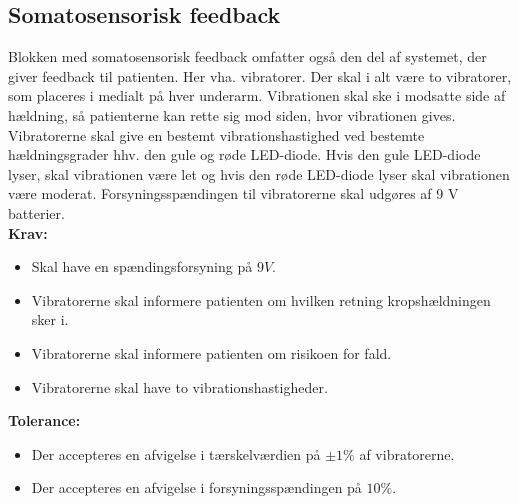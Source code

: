 \subsection{Somatosensorisk feedback} 
Blokken med somatosensorisk feedback omfatter også den del af systemet, der giver feedback til patienten. Her vha. vibratorer. Der skal i alt være to vibratorer, som placeres i medialt på hver underarm. Vibrationen skal ske i modsatte side af hældning, så patienterne kan rette sig mod siden, hvor vibrationen gives. Vibratorerne skal give en bestemt vibrationshastighed ved bestemte hældningsgrader hhv. den gule og røde LED-diode. Hvis den gule LED-diode lyser, skal vibrationen være let og hvis den røde LED-diode lyser skal vibrationen være moderat. Forsyningsspændingen til vibratorerne skal udgøres af 9 V batterier.
\\
\textbf{Krav:}
\begin{itemize}
	\item Skal have en spændingsforsyning på $9V$.
	\item Vibratorerne skal informere patienten om hvilken retning kropshældningen sker i.
	\item Vibratorerne skal informere patienten om risikoen for fald.
	\item Vibratorerne skal have to vibrationshastigheder.
\end{itemize}
\textbf{Tolerance:}
\begin{itemize}
	\item Der accepteres en afvigelse i tærskelværdien på $\pm1\%$ af vibratorerne.
	\item Der accepteres en afvigelse i forsyningsspændingen på $10\%$.
\end{itemize}

